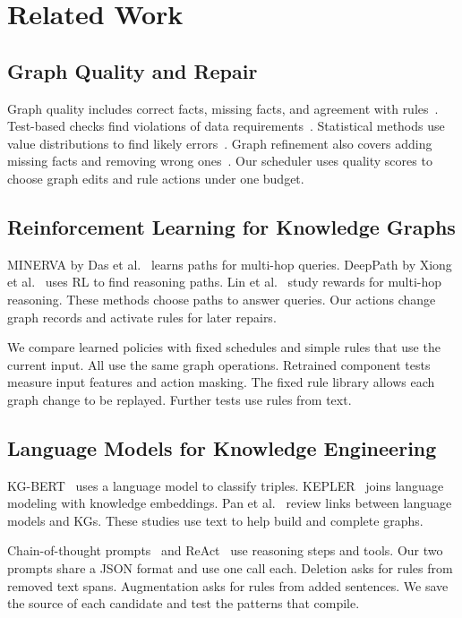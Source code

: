 \section{Related Work}

\label{sec:related_work}

\subsection{Graph Quality and Repair}

Graph quality includes correct facts, missing facts, and agreement with
rules~\cite{ref_zaveri2016}. Test-based checks find violations of data
requirements~\cite{ref_kontokostas2014}. Statistical methods use value
distributions to find likely errors~\cite{ref_paulheim2014}.
Graph refinement also covers adding missing facts and removing wrong
ones~\cite{ref_paulheim2017}. Our scheduler uses quality scores to choose
graph edits and rule actions under one budget.

\subsection{Reinforcement Learning for Knowledge Graphs}

MINERVA by Das et al.~\cite{ref_das2018} learns paths for multi-hop queries.
DeepPath by Xiong et al.~\cite{ref_xiong2017} uses RL to find reasoning paths.
Lin et al.~\cite{ref_lin2018} study rewards for multi-hop reasoning.
These methods choose paths to answer queries. Our actions change graph
records and activate rules for later repairs.

We compare learned policies with fixed schedules and simple rules that use
the current input. All use the same graph operations. Retrained component
tests measure input features and action masking. The fixed rule library
allows each graph change to be replayed. Further tests use rules from text.

\subsection{Language Models for Knowledge Engineering}

KG-BERT~\cite{ref_yao2019} uses a language model to classify triples.
KEPLER~\cite{ref_wang2021kepler} joins language modeling with knowledge
embeddings. Pan et al.~\cite{ref_pan2024} review links between language
models and KGs. These studies use text to help build and complete graphs.

Chain-of-thought prompts~\cite{ref_wei2023} and ReAct~\cite{ref_yao2023}
use reasoning steps and tools. Our two prompts share a JSON format and
use one call each. Deletion asks for rules from removed text spans.
Augmentation asks for rules from added sentences. We save the source of
each candidate and test the patterns that compile.

